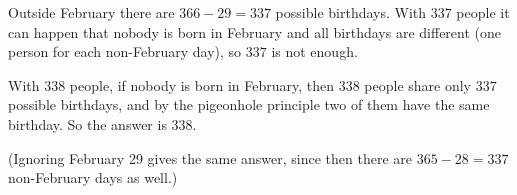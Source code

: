 Outside February there are $366-29=337$ possible birthdays. With $337$ people it can happen that nobody is born in February and all birthdays are different (one person for each non-February day), so $337$ is not enough.

With $338$ people, if nobody is born in February, then $338$ people share only $337$ possible birthdays, and by the pigeonhole principle two of them have the same birthday. So the answer is $\boxed{338}$.

(Ignoring February 29 gives the same answer, since then there are $365-28=337$ non-February days as well.)
